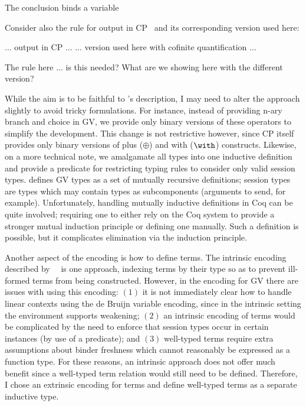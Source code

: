 \documentclass{mprop}
\newcommand{\1}{\textbf{1}\xspace}
\begin{document}
The conclusion binds a variable

Consider also the rule for output in CP~\cite{Wadler:2012} and its corresponding version used here:

... output in CP ... ... version used here with cofinite quantification ...

The rule here ... is this needed? What are we showing here with the different version?

While the aim is to be faithful to \citeauthor{Wadler:2012}'s description, I may need to alter the approach slightly to avoid tricky formulations. For instance, instead of providing n-ary branch and choice in GV, we provide only binary versions of these operators to simplify the development. This change is not restrictive however, since CP itself provides only binary versions of plus ($\oplus$) and with ($\with$) constructs. Likewise, on a more technical note, we amalgamate all types into one inductive definition and provide a predicate for restricting typing rules to consider only valid session types. \citeauthor{Wadler:2012} defines GV types as a set of mutually recursive definitions; session types are types which may contain types as subcomponents (arguments to send, for example). Unfortunately, handling mutually inductive definitions in Coq can be quite involved; requiring one to either rely on the Coq system to provide a stronger mutual induction principle or defining one manually. Such a definition is possible, but it complicates elimination via the induction principle.

Another aspect of the encoding is how to define terms. The intrinsic encoding described by~\citeauthor{Benton:2012:STT}~\cite{Benton:2012:STT} is one approach, indexing terms by their type so as to prevent ill-formed terms from being constructed. However, in the encoding for GV there are issues with using this encoding: $(1)$ it is not immediately clear how to handle linear contexts using the de Bruijn variable encoding, since in the intrinsic setting the environment supports weakening; $(2)$ an intrinsic encoding of terms would be complicated by the need to enforce that session types occur in certain instances (by use of a predicate); and $(3)$ well-typed terms require extra assumptions about binder freshness which cannot reasonably be expressed as a function type. For these reasons, an intrinsic approach does not offer much benefit since a well-typed term relation would still need to be defined. Therefore, I chose an extrinsic encoding for terms and define well-typed terms as a separate inductive type.
\end{document}
